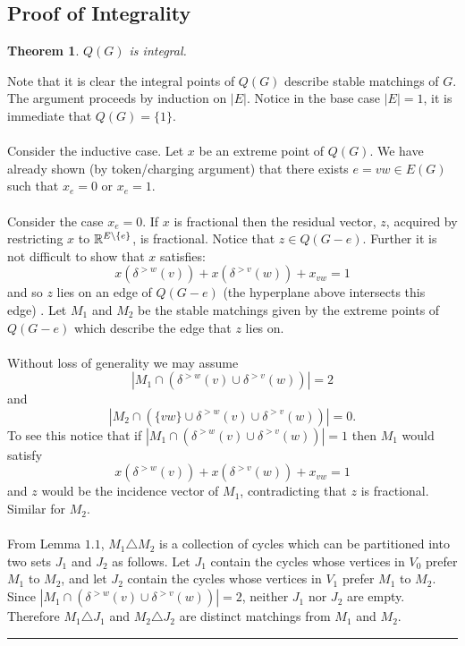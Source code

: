 \documentclass[letterpaper,12pt,oneside,onecolumn]{article}
\newtheorem{theorem}[fact]{Theorem}
\newenvironment{proof}{{\bf Proof:  }}{\hfill\rule{2mm}{2mm}}
\begin{document}
\subsection{Proof of Integrality}
\begin{theorem}
$Q(G)$ is integral.
\end{theorem}
\begin{proof}
Note that it is clear the integral points of $Q(G)$ describe stable matchings of $G$\cite{rothblum1992characterization}. The argument proceeds by induction on $|E|$. Notice in the base case $|E| = 1$, it is immediate that $Q(G) = \{1\}$.
\paragraph{}
Consider the inductive case. Let $x$ be an extreme point of $Q(G)$. We have already shown (by token/charging argument) that there exists $e=vw \in E(G)$ such that $x_e = 0$ or $x_e = 1$. 
\paragraph{}
Consider the case $x_e = 0$. If $x$ is fractional then the residual vector, $z$, acquired by restricting $x$ to $\mathbb{R}^{E\backslash\{e\}}$, is fractional. Notice that $z \in Q(G-e)$. Further it is not difficult to show that $x$ satisfies:
$$x(\delta^{>w}(v))+ x(\delta^{>v}(w)) + x_{vw} = 1$$
and so $z$ lies on an edge of $Q(G-e)$ (the hyperplane above intersects this edge) . Let $M_1$ and $M_2$ be the stable matchings given by the extreme points of $Q(G-e)$ which describe the edge that $z$ lies on.
\paragraph{}
Without loss of generality we may assume
$$ |M_1 \cap(\delta^{>w}(v) \cup \delta^{>v}(w))| = 2 $$
and 
$$ |M_2 \cap(\{vw\} \cup \delta^{>w}(v) \cup \delta^{>v}(w))| = 0.$$
To see this notice that if $|M_1 \cap(\delta^{>w}(v) \cup \delta^{>v}(w))| = 1$ then $M_1$ would satisfy $$x(\delta^{>w}(v))+ x(\delta^{>v}(w)) + x_{vw} = 1$$ and $z$ would be the incidence vector of $M_1$, contradicting that $z$ is fractional. Similar for $M_2$.
\paragraph{}
From Lemma $1.1$, $M_1 \triangle M_2$ is a collection of cycles which can be partitioned into two sets $J_1$ and $J_2$ as follows. Let $J_1$ contain the cycles whose vertices in $V_0$ prefer $M_1$ to $M_2$, and let $J_2$ contain the cycles whose vertices in $V_1$ prefer $M_1$ to $M_2$. Since $|M_1 \cap(\delta^{>w}(v) \cup \delta^{>v}(w))| = 2$, neither $J_1$ nor $J_2$ are empty. Therefore $M_1 \triangle J_1$ and $M_2 \triangle J_2$ are distinct matchings from $M_1$ and $M_2$.

\end{proof}
\end{document}
